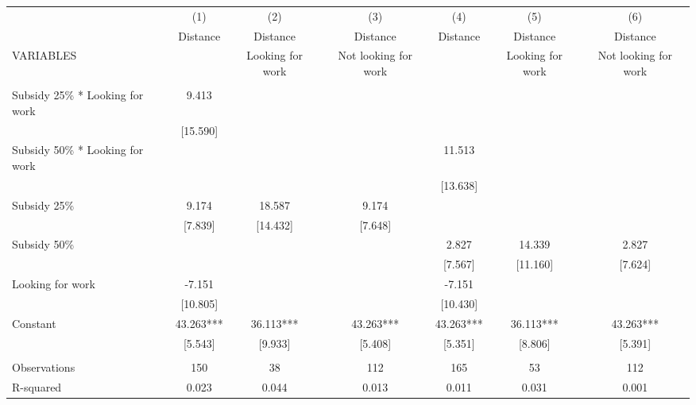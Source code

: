 \begin{tabular}{lcccccc} \hline
 & (1) & (2) & (3) & (4) & (5) & (6) \\
 & Distance & Distance & Distance & Distance & Distance & Distance \\
VARIABLES &  & Looking for work & Not looking for work &  & Looking for work & Not looking for work \\ \hline
 &  &  &  &  &  &  \\
Subsidy 25\% * Looking for work & 9.413 &  &  &  &  &  \\
 & [15.590] &  &  &  &  &  \\
Subsidy 50\% * Looking for work &  &  &  & 11.513 &  &  \\
 &  &  &  & [13.638] &  &  \\
Subsidy 25\% & 9.174 & 18.587 & 9.174 &  &  &  \\
 & [7.839] & [14.432] & [7.648] &  &  &  \\
Subsidy 50\% &  &  &  & 2.827 & 14.339 & 2.827 \\
 &  &  &  & [7.567] & [11.160] & [7.624] \\
Looking for work & -7.151 &  &  & -7.151 &  &  \\
 & [10.805] &  &  & [10.430] &  &  \\
Constant & 43.263*** & 36.113*** & 43.263*** & 43.263*** & 36.113*** & 43.263*** \\
 & [5.543] & [9.933] & [5.408] & [5.351] & [8.806] & [5.391] \\
 &  &  &  &  &  &  \\
Observations & 150 & 38 & 112 & 165 & 53 & 112 \\
 R-squared & 0.023 & 0.044 & 0.013 & 0.011 & 0.031 & 0.001 \\ \hline
\end{tabular}
